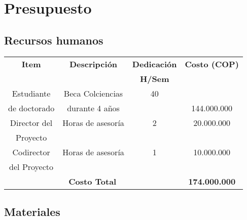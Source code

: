 \chapter{Presupuesto}

\section{Recursos humanos}

\begin{tabular}{|c|c|c|c|}\hline
{\bf Item} 	& {\bf Descripción} 			& {\bf Dedicación} 	& {\bf Costo (COP)} \\
                                            &	    & {\bf H/Sem}  & 	\\\hline
Estudiante 	        &  Beca Colciencias		&  40   & 				\\
de doctorado  	    &  durante 4 años		&       & 144.000.000     	\\\hline

Director del 	    & Horas de asesoría		& 2	    & 20.000.000  		\\
Proyecto  		    & 		                &  		& 				\\\hline
Codirector 	        & Horas de asesoría 	& 1     & 10.000.000  		\\
del Proyecto        &  	                    & 		& 		\\\hline
\multicolumn{3}{|c|}{\bf Costo Total} 	    & {\bf 174.000.000}			\\\hline
\end{tabular}


\section{Materiales}

